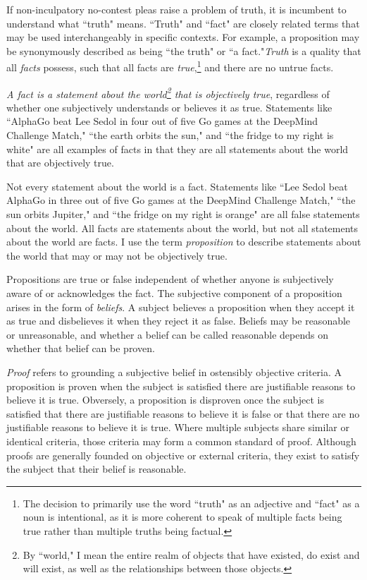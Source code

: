 If non-inculpatory no-contest pleas raise a problem of truth, it is incumbent to understand what ``truth" means. ``Truth" and ``fact" are closely related terms that may be used interchangeably in specific contexts. For example, a proposition may be synonymously described as being ``the truth" or ``a fact."\textit{Truth} is a quality that all \textit{facts} possess, such that all facts are \textit{true},\footnote{The decision to primarily use the word ``truth" as an adjective and ``fact" as a noun is intentional, as it is more coherent to speak of multiple facts being true rather than multiple truths being factual.} and there are no untrue facts.

\textit{A fact is a statement about the world\footnote{By ``world," I mean the entire realm of objects that have existed, do exist and will exist, as well as the relationships between those objects.} that is objectively true}, regardless of whether one subjectively understands or believes it as true. Statements like ``AlphaGo beat Lee Sedol in four out of five Go games at the DeepMind Challenge Match," ``the earth orbits the sun," and ``the fridge to my right is white" are all examples of facts in that they are all statements about the world that are objectively true.

Not every statement about the world is a fact. Statements like ``Lee Sedol beat AlphaGo in three out of five Go games at the DeepMind Challenge Match," ``the sun orbits Jupiter," and ``the fridge on my right is orange" are all false statements about the world. All facts are statements about the world, but not all statements about the world are facts. I use the term \textit{proposition} to describe statements about the world that may or may not be objectively true.

Propositions are true or false independent of whether anyone is subjectively aware of or acknowledges the fact. The subjective component of a proposition arises in the form of \textit{beliefs}. A subject believes a proposition when they accept it as true and disbelieves it when they reject it as false. Beliefs may be reasonable or unreasonable, and whether a belief can be called reasonable depends on whether that belief can be proven.

\textit{Proof} refers to grounding a subjective belief in ostensibly objective criteria. A proposition is proven when the subject is satisfied there are justifiable reasons to believe it is true. Obversely, a proposition is disproven once the subject is satisfied that there are justifiable reasons to believe it is false or that there are no justifiable reasons to believe it is true. Where multiple subjects share similar or identical criteria, those criteria may form a common standard of proof. Although proofs are generally founded on objective or external criteria, they exist to satisfy the subject that their belief is reasonable. 

